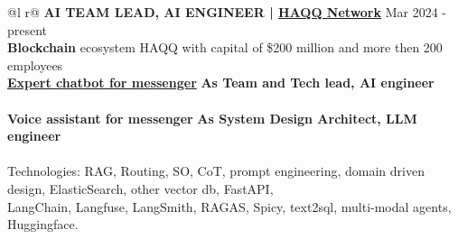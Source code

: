 \documentclass[a4paper,12pt]{article}
\begin{document}
\begin{tabularx}{\linewidth}{ @{}l r@{} }
\textbf{AI TEAM LEAD, AI ENGINEER | \href{https://haqq.network/}{HAQQ Network}} \hfill Mar 2024 - present \\[3.75pt]
\footnotesize \textbf{Blockchain} ecosystem HAQQ with capital of \$200 million and more then 200 employees \\ [1.0pt]

\textbf{\href{https://www.mmapp.org/}{Expert chatbot for messenger}} \hfill \textbf {As Team and Tech lead, AI engineer}\\
  \\ [4.0pt]
\textbf{Voice assistant for messenger}   \hfill \textbf{As System Design Architect, LLM engineer}\\
  \\
\footnotesize Technologies: RAG, Routing, SO, CoT, prompt engineering, domain driven design, ElasticSearch, other vector db, FastAPI,\\
\footnotesize  LangChain, Langfuse, LangSmith, RAGAS, Spicy, text2sql, multi-modal agents, Huggingface.  \\
\end{tabularx}
\end{document}
